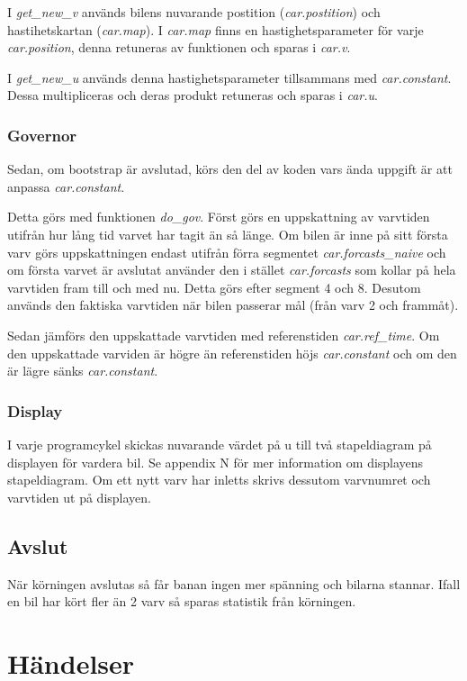 \documentclass[10pt,oneside,swedish]{lips-no_customer}
\begin{document}
I \emph{get\_new\_v} används bilens nuvarande postition (\emph{car.postition})
och hastihetskartan (\emph{car.map}). I \emph{car.map} finns en
hastighetsparameter för varje \emph{car.position}, denna retuneras av funktionen
och sparas i \emph{car.v}.
 
I \emph{get\_new\_u} används denna hastighetsparameter tillsammans med
\emph{car.constant}. Dessa multipliceras och deras produkt retuneras och sparas
i \emph{car.u}.

\subsubsection{Governor}

Sedan, om bootstrap är avslutad, körs den del av koden vars ända uppgift är att 
anpassa \emph{car.constant}. 

Detta görs med funktionen \emph{do\_gov}.  Först görs en uppskattning av varvtiden utifrån hur lång tid varvet har tagit än
så länge. Om bilen är inne på sitt första varv görs uppskattningen endast
utifrån förra segmentet \emph{car.forcasts\_naive} och om första varvet är
avslutat använder den i stället \emph{car.forcasts} som kollar på hela varvtiden
fram till och med nu. Detta görs efter segment 4 och 8. Desutom används den
faktiska varvtiden när bilen passerar mål (från varv 2 och frammåt).
 
Sedan jämförs den uppskattade varvtiden med referenstiden \emph{car.ref\_time}.
Om den uppskattade varviden är högre än referenstiden höjs \emph{car.constant}
och om den är lägre sänks \emph{car.constant}.

\subsubsection{Display}

I varje programcykel skickas nuvarande värdet på u till två stapeldiagram på
displayen för vardera bil. Se appendix N för mer information om displayens
stapeldiagram. Om ett nytt varv har inletts skrivs dessutom varvnumret och
varvtiden ut på displayen.

\subsection{Avslut}

När körningen avslutas så får banan ingen mer spänning och bilarna stannar.
Ifall en bil har kört fler än 2 varv så sparas statistik från körningen. 

\section{Händelser}
\end{document}
